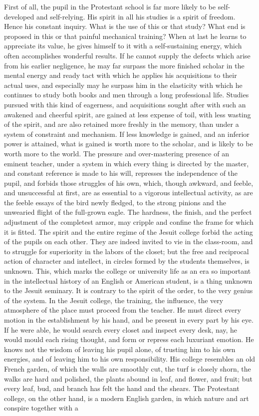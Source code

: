 \documentclass[]{book}
\begin{document}
First of all, the pupil in the Protestant school is far more likely to be self-developed and self-relying. His spirit in all his studies is a spirit of freedom. Hence his constant inquiry. What is the use of this or that study? What end is proposed in this or that painful mechanical training? When at last he learns to appreciate its value, he gives himself to it with a self-sustaining energy, which often accomplishes wonderful results. If he cannot supply the defects which arise from his earlier negligence, he may far surpass the more finished scholar in the mental energy and ready tact with which he applies his acquisitions to their actual uses, and especially may he surpass him in the elasticity with which he continues to study both books and men through a long professional life. Studies pursued with this kind of eagerness, and acquisitions sought after with such an awakened and cheerful spirit, are gained at less expense of toil, with less wasting of the spirit, and are also retained more freshly in the memory, than under a system of constraint and mechanism. If less knowledge is gained, and an inferior power is attained, what is gained is worth more to the scholar, and is likely to be worth more to the world. The pressure and over-mastering presence of an eminent teacher, under a system in which every thing is directed by the master, and constant reference is made to his will, represses the independence of the pupil, and forbids those struggles of his own, which, though awkward, and feeble, and unsuccessful at first, are as essential to a vigorous intellectual activity, as are the feeble essays of the bird newly fledged, to the strong pinions and the unwearied flight of the full-grown eagle. The hardness, the finish, and the perfect adjustment of the completest armor, may cripple and confine the frame for which it is fitted. The spirit and the entire regime of the Jesuit college forbid the acting of the pupils on each other. They are indeed invited to vie in the class-room, and to struggle for superiority in the labors of the closet; but the free and reciprocal action of character and intellect, in circles formed by the students themselves, is unknown. This, which marks the college or university life as an era so important in the intellectual history of an English or American student, is a thing unknown to the Jesuit seminary. It is contrary to the spirit of the order, to the very genius of the system. In the Jesuit college, the training, the influence, the very atmosphere of the place must proceed from the teacher. He must direct every motion in the establishment by his hand, and be present in every part by his eye. If he were able, he would search every closet and inspect every desk, nay, he would mould each rising thought, and form or repress each luxuriant emotion. He knows not the wisdom of leaving his pupil alone, of trusting him to his own energies, and of leaving him to his own responsibility. His college resembles an old French garden, of which the walls are smoothly cut, the turf is closely shorn, the walks are hard and polished, the plants abound in leaf, and flower, and fruit; but every leaf, bud, and branch has felt the hand and the shears. The Protestant college, on the other hand, is a modern English garden, in which nature and art conspire together with a 
\end{document}
